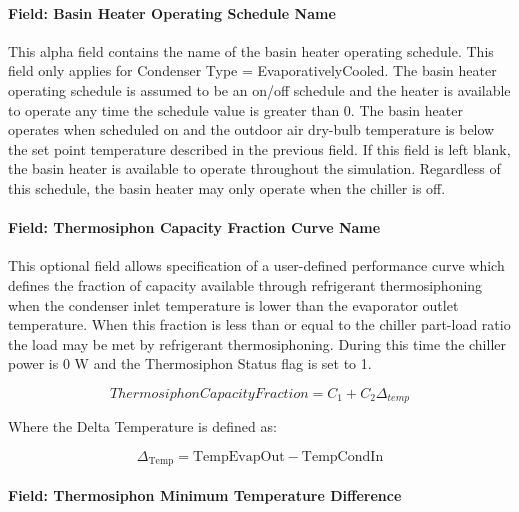 \paragraph{Field: Basin Heater Operating Schedule Name}\label{field-basin-heater-operating-schedule-name-002}

This alpha field contains the name of the basin heater operating schedule. This field only applies for Condenser Type = EvaporativelyCooled. The basin heater operating schedule is assumed to be an on/off schedule and the heater is available to operate any time the schedule value is greater than 0. The basin heater operates when scheduled on and the outdoor air dry-bulb temperature is below the set point temperature described in the previous field. If this field is left blank, the basin heater is available to operate throughout the simulation. Regardless of this schedule, the basin heater may only operate when the chiller is off.

\paragraph{Field: Thermosiphon Capacity Fraction Curve Name}\label{thermosiphon-capacity-fraction-curve-name1}

This optional field allows specification of a user-defined performance curve which defines the fraction of capacity available through refrigerant thermosiphoning when the condenser inlet temperature is lower than the evaporator outlet temperature. When this fraction is less than or equal to the chiller part-load ratio the load may be met by refrigerant thermosiphoning. During this time the chiller power is 0 W and the Thermosiphon Status flag is set to 1.

\begin{equation}
    ThermosiphonCapacityFraction = {C_1} + {C_2}{\Delta_{temp}}
\end{equation}

Where the Delta Temperature is defined as:

\begin{equation}
{\Delta_{{\mathrm{Temp}}}}
    = {\mathrm{TempEvapOut  -  TempCondIn }}
\end{equation}

\paragraph{Field: Thermosiphon Minimum Temperature Difference}\label{thermosiphon-minimum-temperature-difference1}

